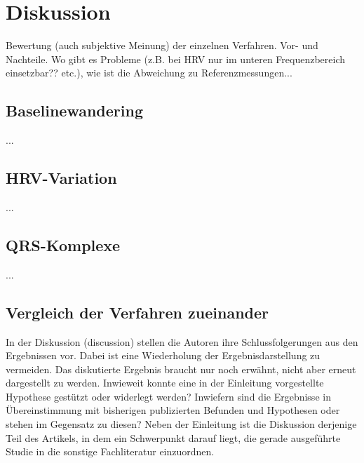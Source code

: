 
\chapter{Diskussion} 
Bewertung (auch subjektive Meinung) der einzelnen Verfahren. Vor- und Nachteile. Wo gibt es Probleme (z.B. bei HRV nur im unteren Frequenzbereich einsetzbar?? etc.), wie ist die Abweichung zu Referenzmessungen...
\section{Baselinewandering}
...
\section{HRV-Variation}
...
\section{QRS-Komplexe}
...
\section{Vergleich der Verfahren zueinander}

\vspace{2cm}
In der Diskussion (discussion) stellen die Autoren ihre Schlussfolgerungen aus den Ergebnissen
vor. Dabei ist eine Wiederholung der Ergebnisdarstellung zu vermeiden. Das diskutierte
Ergebnis braucht nur noch erwähnt, nicht aber erneut dargestellt zu werden. Inwieweit konnte
eine in der Einleitung vorgestellte Hypothese gestützt oder widerlegt werden? Inwiefern sind
die Ergebnisse in Übereinstimmung mit bisherigen publizierten Befunden und Hypothesen oder
stehen im Gegensatz zu diesen? Neben der Einleitung ist die Diskussion derjenige Teil des
Artikels, in dem ein Schwerpunkt darauf liegt, die gerade ausgeführte Studie in die sonstige
Fachliteratur einzuordnen.
